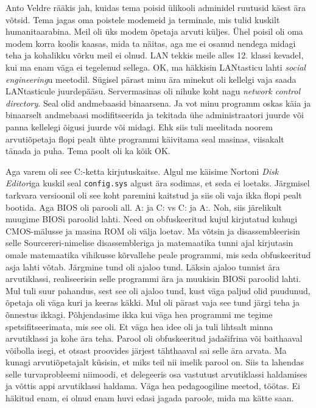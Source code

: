 Anto Veldre rääkis jah, kuidas tema poisid ülikooli adminidel ruutusid käest ära võtsid. Tema jagas oma poistele modemeid ja terminale, mis tulid kuskilt humanitaarabina. Meil oli üks modem õpetaja arvuti küljes. Ühel poisil oli oma modem korra koolis kaasas, mida ta näitas, aga me ei osanud nendega midagi teha ja kohalikku võrku meil ei olnud. LAN tekkis meile alles 12. klassi kevadel, kui ma enam väga ei tegelenud sellega. OK, ma häkkisin LANtasticu lahti \emph{social engineering}u meetodil. Sügisel pärast minu ära minekut oli kellelgi vaja saada LANtasticule juurdepääsu. Servermasinas oli nihuke koht nagu \emph{network control directory}. Seal olid andmebaasid binaarsena. Ja vot minu programm oskas käia ja binaarselt andmebaasi modifitseerida ja tekitada ühe administraatori juurde või panna kellelegi õigusi juurde või midagi. Ehk siis tuli meelitada noorem arvutiõpetaja flopi pealt ühte programmi käivitama seal masinas, viisakalt tänada ja puha. Tema poolt oli ka kõik OK. 

Aga varem oli see C:-ketta kirjutuskaitse. Algul me käisime Nortoni \emph{Disk Editor}iga kuskil seal \verb|config.sys| algust ära sodimas, et seda ei loetaks. Järgmisel tarkvara versioonil oli see koht paremini kaitstud ja siis oli vaja ikka flopi pealt bootida. Aga BIOS oli parooli all. A: ja C: vs C: ja A:. Noh, siis järelikult muugime BIOSi paroolid lahti. Need on obfuskeeritud kujul kirjutatud kuhugi CMOS-mälusse ja masina ROM oli välja loetav. Ma võtsin ja disassembleerisin selle Sourcereri-nimelise disassembleriga ja matemaatika tunni ajal kirjutasin omale matemaatika vihikusse kõrvallehe peale programmi, mis seda obfuskeeritud asja lahti võtab. Järgmine tund oli ajaloo tund. Läksin ajaloo tunnist ära arvutiklassi, realiseerisin selle programmi ära ja muukisin BIOSi paroolid lahti. Mul tuli suur pahandus, sest see oli ajaloo tund, kust väga paljud olid puudunud, õpetaja oli väga kuri ja keeras käkki. Mul oli pärast vaja see tund järgi teha ja õnnestus ikkagi. Põhjendasime ikka kui väga hea programmi me tegime spetsifitseerimata, mis see oli. Et väga hea idee oli ja tuli lihtsalt minna arvutiklassi ja kohe ära teha. Parool oli obfuskeeritud jadašifrina või baithaaval võibolla isegi, et otsast proovides järjest tähthaaval sai selle ära arvata. Ma kunagi arvutiõpetajalt küsisin, et miks teil nii imelik parool on. Siis ta lahendas selle turvaprobleemi niimoodi, et delegeeris osa vastutust arvutiklassi haldamises ja võttis appi arvutiklassi haldama. Väga hea pedagoogiline meetod, töötas. Ei häkitud enam, ei olnud enam huvi edasi jagada paroole, mida ma kätte saan. 


